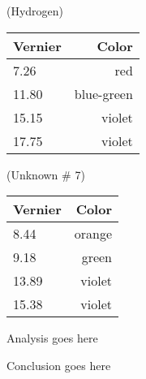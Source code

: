 \begin{paper}
(Hydrogen)

\begin{tabular}{|l|r|}
	\hline
	Vernier & Color \\ \hline
	7.26 & red \\ \hline
	11.80 & blue-green \\ \hline
	15.15 & violet \\ \hline
	17.75 & violet \\ \hline
\end{tabular}

(Unknown \# 7)

\begin{tabular}{|l|r|}
	\hline
	Vernier & Color \\ \hline
	8.44 & orange \\ \hline
	9.18 & green \\ \hline
	13.89 & violet \\ \hline
	15.38 & violet \\ \hline
\end{tabular}


Analysis goes here


Conclusion goes here
\end{paper}
